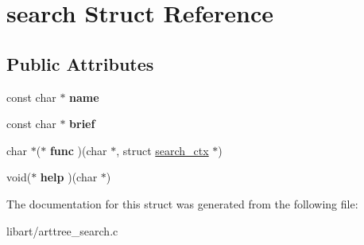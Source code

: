 \hypertarget{structsearch}{}\section{search Struct Reference}
\label{structsearch}
\subsection*{Public Attributes}
\begin{DoxyCompactItemize}
\item 
\mbox{\label{structsearch_aeab278eaef67475525237a8ecb4a702e}} 
const char $\ast$ {\bfseries name}
\item 
\mbox{\label{structsearch_a90762ee05ac010629da6861eadaa4b3c}} 
const char $\ast$ {\bfseries brief}
\item 
\mbox{\label{structsearch_abd75e1a862394d5d580addd00d14c52c}} 
char $\ast$($\ast$ {\bfseries func} )(char $\ast$, struct \hyperlink{structsearch__ctx}{search\+\_\+ctx} $\ast$)
\item 
\mbox{\label{structsearch_a754188dbcf7b3001d5b814a1f41aa328}} 
void($\ast$ {\bfseries help} )(char $\ast$)
\end{DoxyCompactItemize}


The documentation for this struct was generated from the following file\+:\begin{DoxyCompactItemize}
\item 
libart/arttree\+\_\+search.\+c\end{DoxyCompactItemize}
